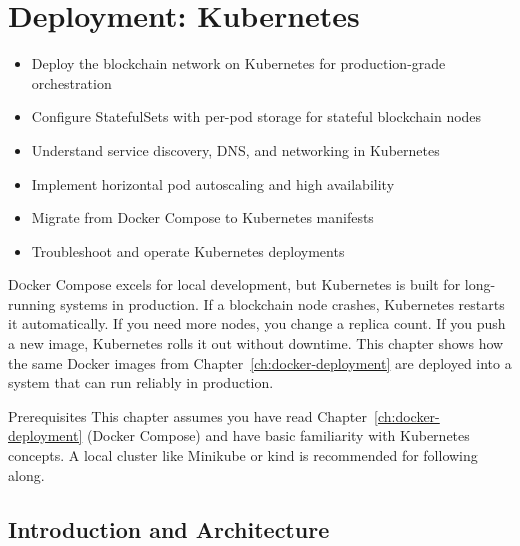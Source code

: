 \chapter{Deployment: Kubernetes}
\label{ch:k8s-deployment}

\begin{learnbox}
\begin{itemize}
  \item Deploy the blockchain network on Kubernetes for production-grade orchestration
  \item Configure StatefulSets with per-pod storage for stateful blockchain nodes
  \item Understand service discovery, DNS, and networking in Kubernetes
  \item Implement horizontal pod autoscaling and high availability
  \item Migrate from Docker Compose to Kubernetes manifests
  \item Troubleshoot and operate Kubernetes deployments
\end{itemize}
\end{learnbox}

\lettrine{D}{o}cker Compose excels for local development, but Kubernetes is built for long-running systems in production. If a blockchain node crashes, Kubernetes restarts it automatically. If you need more nodes, you change a replica count. If you push a new image, Kubernetes rolls it out without downtime. This chapter shows how the same Docker images from Chapter~\ref{ch:docker-deployment} are deployed into a system that can run reliably in production.

\begin{infobox}{Prerequisites}
This chapter assumes you have read Chapter~\ref{ch:docker-deployment} (Docker Compose) and have basic familiarity with Kubernetes concepts. A local cluster like Minikube or kind is recommended for following along.
\end{infobox}

\section{Introduction and Architecture}
\label{sec:k8s-introduction}

